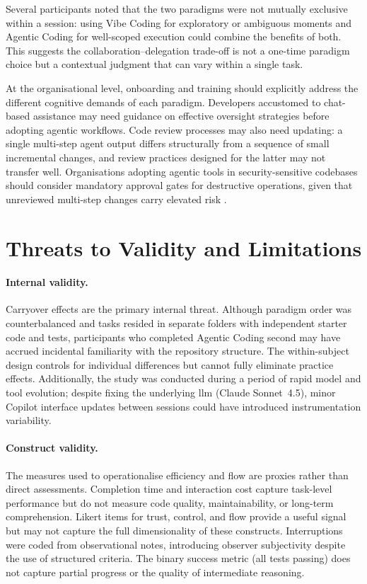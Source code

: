 Several participants noted that the two paradigms were not mutually exclusive within a session: using Vibe Coding for exploratory or ambiguous moments and Agentic Coding for well-scoped execution could combine the benefits of both. This suggests the collaboration--delegation trade-off is not a one-time paradigm choice but a contextual judgment that can vary within a single task.

At the organisational level, onboarding and training should explicitly address the different cognitive demands of each paradigm. Developers accustomed to chat-based assistance may need guidance on effective oversight strategies before adopting agentic workflows. Code review processes may also need updating: a single multi-step agent output differs structurally from a sequence of small incremental changes, and review practices designed for the latter may not transfer well. Organisations adopting agentic tools in security-sensitive codebases should consider mandatory approval gates for destructive operations, given that unreviewed multi-step changes carry elevated risk \parencite{perry2023insecure}.


\section{Threats to Validity and Limitations}

\label{sec:disc-threats}

\paragraph{Internal validity.} Carryover effects are the primary internal threat. Although paradigm order was counterbalanced and tasks resided in separate folders with independent starter code and tests, participants who completed Agentic Coding second may have accrued incidental familiarity with the repository structure. The within-subject design controls for individual differences but cannot fully eliminate practice effects. Additionally, the study was conducted during a period of rapid model and tool evolution; despite fixing the underlying \gls{llm} (Claude Sonnet~4.5), minor Copilot interface updates between sessions could have introduced instrumentation variability.

\paragraph{Construct validity.} The measures used to operationalise efficiency and flow are proxies rather than direct assessments. Completion time and interaction cost capture task-level performance but do not measure code quality, maintainability, or long-term comprehension. Likert items for trust, control, and flow provide a useful signal but may not capture the full dimensionality of these constructs. Interruptions were coded from observational notes, introducing observer subjectivity despite the use of structured criteria. The binary success metric (all tests passing) does not capture partial progress or the quality of intermediate reasoning.

